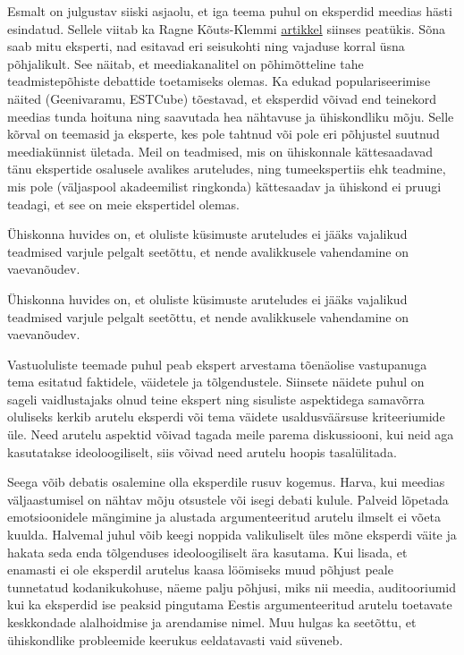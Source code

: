\documentclass[estonian,]{article}
\begin{document}
Esmalt on julgustav siiski asjaolu, et iga teema puhul on eksperdid meedias hästi esindatud. Sellele viitab ka Ragne Kõuts-Klemmi \protect\hyperlink{chapter43}{artikkel} siinses peatükis. Sõna saab mitu eksperti, nad esitavad eri seisukohti ning vajaduse korral üsna põhjalikult. See näitab, et meediakanalitel on põhimõtteline tahe teadmistepõhiste debattide toetamiseks olemas. Ka edukad populariseerimise näited (Geenivaramu, ESTCube) tõestavad, et eksperdid võivad end teinekord meedias tunda hoituna ning saavutada hea nähtavuse ja ühiskondliku mõju. Selle kõrval on teemasid ja eksperte, kes pole tahtnud või pole eri põhjustel suutnud meediakünnist ületada. Meil on teadmised, mis on ühiskonnale kättesaadavad tänu ekspertide osalusele avalikes aruteludes, ning tumeekspertiis ehk teadmine, mis pole (väljaspool akadeemilist ringkonda) kättesaadav ja ühiskond ei pruugi teadagi, et see on meie ekspertidel olemas.

Ühiskonna huvides on, et oluliste küsimuste aruteludes ei jääks vajalikud teadmised varjule pelgalt seetõttu, et nende avalikkusele vahendamine on vaevanõudev.

\begin{blockquote-right}
Ühiskonna huvides on, et oluliste küsimuste aruteludes ei jääks
vajalikud teadmised varjule pelgalt seetõttu, et nende avalikkusele
vahendamine on vaevanõudev.
\end{blockquote-right}

Vastuoluliste teemade puhul peab ekspert arvestama tõenäolise vastupanuga tema esitatud faktidele, väidetele ja tõlgendustele. Siinsete näidete puhul on sageli vaidlustajaks olnud teine ekspert ning sisuliste aspektidega samavõrra oluliseks kerkib arutelu eksperdi või tema väidete usaldusväärsuse kriteeriumide üle. Need arutelu aspektid võivad tagada meile parema diskussiooni, kui neid aga kasutatakse ideoloogiliselt, siis võivad need arutelu hoopis tasalülitada.

Seega võib debatis osalemine olla eksperdile rusuv kogemus. Harva, kui meedias väljaastumisel on nähtav mõju otsustele või isegi debati kulule. Palveid lõpetada emotsioonidele mängimine ja alustada argumenteeritud arutelu ilmselt ei võeta kuulda. Halvemal juhul võib keegi noppida valikuliselt üles mõne eksperdi väite ja hakata seda enda tõlgenduses ideoloogiliselt ära kasutama. Kui lisada, et enamasti ei ole eksperdil arutelus kaasa löömiseks muud põhjust peale tunnetatud kodanikukohuse, näeme palju põhjusi, miks nii meedia, auditooriumid kui ka eksperdid ise peaksid pingutama Eestis argumenteeritud arutelu toetavate keskkondade alalhoidmise ja arendamise nimel. Muu hulgas ka seetõttu, et ühiskondlike probleemide keerukus eeldatavasti vaid süveneb.
\end{document}
